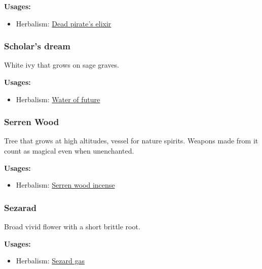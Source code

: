 \vspace{5mm}

\textbf{Usages:}

\begin{itemize}[noitemsep]
\item[] Herbalism: \hyperref[Dead pirate's elixir]{Dead pirate's elixir}
\end{itemize}

\subsubsection{Scholar's dream}
\label{Scholar's dream}

White ivy that grows on sage graves.

\vspace{5mm}

\textbf{Usages:}

\begin{itemize}[noitemsep]
\item[] Herbalism: \hyperref[Water of future]{Water of future}
\end{itemize}

\subsubsection{Serren Wood}
\label{Serren Wood}

Tree that grows at high altitudes, vessel for nature spirits. Weapons made from it count as magical even when unenchanted.

\vspace{5mm}

\textbf{Usages:}

\begin{itemize}[noitemsep]
\item[] Herbalism: \hyperref[Serren wood incense]{Serren wood incense}
\end{itemize}

\subsubsection{Sezarad}
\label{Sezarad}

Broad vivid flower with a short brittle root.

\vspace{5mm}

\textbf{Usages:}

\begin{itemize}[noitemsep]
\item[] Herbalism: \hyperref[Sezard gas]{Sezard gas}
\end{itemize}

